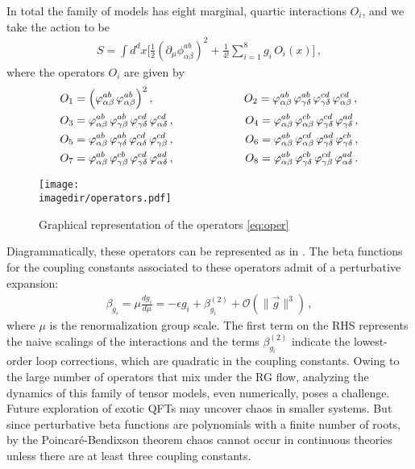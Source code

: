 In total the family of models has eight marginal, quartic interactions $O_i$, and we take the action to be
\begin{align}
S = \int d^dx\bigg[\frac{1}{2}(\partial_\mu \phi^{ab}_{\alpha\beta})^2
+\frac{1}{4!}\sum_{i=1}^8g_i\,O_i(x)\bigg]\,, \label{eq:action}
\end{align}
where the operators $O_i$ are given by
\begin{align}
&O_1= \Big(\phi^{ab}_{\alpha\beta}\,\phi^{ab}_{\alpha\beta}\Big)^2\,,
\hspace{28mm}
O_2= \phi^{ab}_{\alpha\beta}\,\phi^{ab}_{\gamma\delta}\,\phi^{cd}_{\gamma\delta}\,\phi^{cd}_{\alpha\beta}\,,
\notag
\\
\label{eq:operators}
&O_3= \phi^{ab}_{\alpha\beta}\,\phi^{ab}_{\gamma\beta}\,\phi^{cd}_{\gamma\delta}\,\phi^{cd}_{\alpha\delta}\,,
\hspace{22mm}
O_4= \phi^{ab}_{\alpha\beta}\,\phi^{cb}_{\alpha\beta}\,\phi^{cd}_{\gamma\delta}\,\phi^{ad}_{\gamma\delta}\,,
\\
&O_5= \phi^{ab}_{\alpha\beta}\,\phi^{ab}_{\gamma\delta}\,\phi^{cd}_{\alpha\delta}\,\phi^{cd}_{\gamma\beta}\,,
\hspace{22mm}
O_6= \phi^{ab}_{\alpha\beta}\,\phi^{cd}_{\alpha\beta}\,\phi^{ad}_{\gamma\delta}\,\phi^{cb}_{\gamma\delta}\,,
\notag
\\
&O_7= \phi^{ab}_{\alpha\beta}\,\phi^{cb}_{\gamma\beta}\,\phi^{cd}_{\gamma\delta}\,\phi^{ad}_{\alpha\delta}\,,
\hspace{22mm}
O_8= \phi^{ab}_{\alpha\beta}\,\phi^{cb}_{\gamma\delta}\,\phi^{cd}_{\gamma\beta}\,\phi^{ad}_{\alpha\delta}\,.
\notag
\label{eq:oper}
\end{align}
\begin{figure}
\centering
  \texttt{[image: \\imagedir/operators.pdf]}
\caption{Graphical representation of the operators \cref{eq:oper}}
\label{fig:oper}
\end{figure}
Diagrammatically, these operators can be represented as in . The beta functions for the coupling constants associated to these operators admit of a perturbative expansion:
\begin{align}
\beta_{g_i}= \mu\frac{dg_i}{d\mu}=-\epsilon g_i+\beta_{g_i}^{(2)}+\mathcal{O}(\| \vec g \|^3)\,,
\end{align}
where $\mu$ is the renormalization group scale. The first term on the RHS represents the naive scalings of the interactions and the terms $\beta_{g_i}^{(2)}$ indicate the lowest-order loop corrections, which are quadratic in the coupling constants. Owing to the large number of operators that mix under the RG flow, analyzing the dynamics of this family of tensor models, even numerically, poses a challenge. Future exploration of exotic QFTs may uncover chaos in smaller systems. But since perturbative beta functions are polynomials with a finite number of roots, by the Poincar\'e-Bendixson theorem chaos cannot occur in continuous theories unless there are at least three coupling constants.

